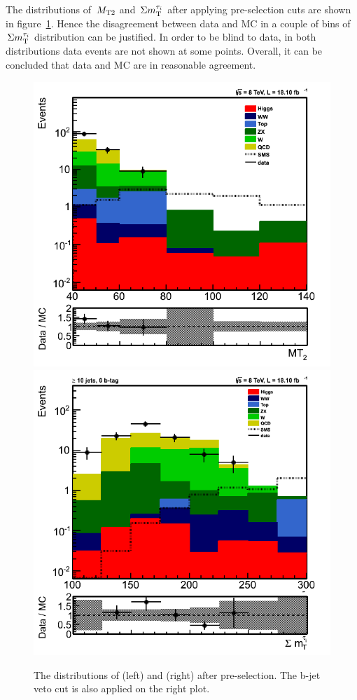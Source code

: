 The distributions of $\,{M_{\rm T2}}$ and $\,\Sigma m_{\rm T}^{\tau_i}$ after applying pre-selection cuts are shown in figure~\ref{fig:comparison}.  Hence the disagreement between data and MC in a couple of bins of $\,\Sigma m_{\rm T}^{\tau_i}$ distribution can be justified. In order to be blind to data, in both distributions data events are not shown at some points. Overall, it can be concluded that data and MC are in reasonable agreement. 
\begin{figure}[!Hhtb]
\centering
\includegraphics[angle=0,scale=0.35]{QCDbginTauTau/Bin1_QCDdatadriven_Samesign.png}
\includegraphics[angle=0,scale=0.35]{QCDbginTauTau/Bin2_QCDdatadriven_Samesign.png} \\
\caption{The distributions of \mttwo (left) and \SumMT (right) after pre-selection. The b-jet veto cut is also applied on the right plot.}
\label{fig:comparison}
\end{figure}

